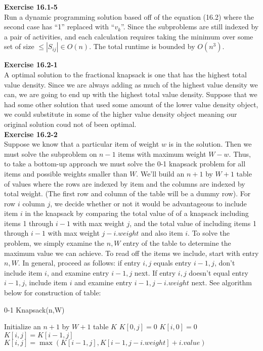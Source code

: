 \documentclass{article}
\begin{document}
\noindent\textbf{Exercise 16.1-5}\\

Run a dynamic programming solution based off of the equation (16.2) where the second case has ``1'' replaced with ``$v_k$''. Since the subproblems are still indexed by a pair of activities, and each calculation requires taking the minimum over some set of size $\le |S_{ij}| \in O(n)$. The total runtime is bounded by $O(n^3)$.

\noindent\textbf{Exercise 16.2-1}\\

A optimal solution to the fractional knapsack is one that has the highest total value density. Since we are always adding as much of the highest value density we can, we are going to end up with the highest total value density. Suppose that we had some other solution that used some amount of the lower value density object, we could substitute in some of the higher value density object meaning our original solution coud not of been optimal.\\

\noindent\textbf{Exercise 16.2-2}\\

Suppose we know that a particular item of weight $w$ is in the solution.  Then we must solve the subproblem on $n-1$ items with maximum weight $W-w$.  Thus, to take a bottom-up approach we must solve the 0-1 knapsack problem for all items and possible weights smaller than $W$.  We'll build an $n+1$ by $W+1$ table of values where the rows are indexed by item and the columns are indexed by total weight.  (The first row and column of the table will be a dummy row).  For row $i$ column $j$, we decide whether or not it would be advantageous to include item $i$ in the knapsack by comparing the total value of of a knapsack including items 1 through $i-1$ with max weight $j$, and the total value of including items 1 through $i-1$ with max weight $j- i.weight$ and also item $i$.  To solve the problem, we simply examine the $n,W$ entry of the table to determine the maximum value we can achieve. To read off the items we include, start with entry $n,W$.  In general, proceed as follows: if entry $i,j$ equals entry $i-1,j$, don't include item $i$, and examine entry $i-1,j$ next.  If entry $i,j$ doesn't equal entry $i-1,j$, include item $i$ and examine entry $i-1,j-i.weight$ next.  See algorithm below for construction of table:

\begin{algorithm}
\caption{0-1 Knapsack(n,W)}
\begin{algorithmic}[1]
\State Initialize an $n+1$ by $W+1$ table $K$
	\State $K[0,j] = 0$
\EndFor
{}
	\State $K[i,0] = 0$
\EndFor
{}
			\State $K[i,j] = K[i-1,j]$
		\EndIf
		\State $K[i,j] = \max(K[i-1,j], K[i-1,j-i.weight] + i.value)$
	\EndFor
\EndFor
\end{algorithmic}
\end{algorithm}
\end{document}
